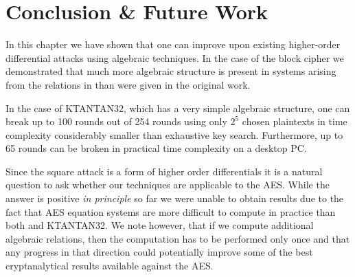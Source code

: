 \section{Conclusion \& Future Work}
In this chapter we have shown that one can improve upon existing higher-order differential attacks using algebraic techniques. In the case of the block cipher \PRESENT we demonstrated that much more algebraic structure is present in systems arising from the relations in \cite{bit-pattern-ia} than were given in the original work.

In the case of KTANTAN32, which has a very simple algebraic structure, one can break up to 100 rounds out of 254 rounds using only $2^5$ chosen plaintexts in time complexity considerably smaller than exhaustive key search. Furthermore, up to 65 rounds can be broken in practical time complexity on a desktop PC.

Since the square attack is a form of higher order differentials it is a natural question to ask  whether our techniques are applicable to the AES. While the answer is positive \emph{in principle} so far we were unable to obtain results due to the fact that AES equation systems are more difficult to compute in practice than both \PRESENT and KTANTAN32. We note however, that if we compute additional algebraic relations, then the computation has to be performed only once and that any progress in that direction could potentially improve some of the best cryptanalytical results available against the AES.